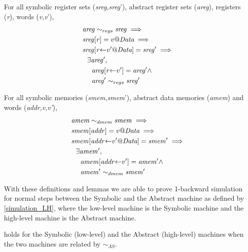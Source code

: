 \begin{lemma}
\label{refine_registers_upd}
For all symbolic register sets (\textit{sreg,sreg}'),
abstract register sets (\textit{areg}), registers (\textit{r}),
words (\textit{v,v}'),
\begin{align*}
  & \mathit{areg} \sim_{regs} \mathit{sreg} \implies \\
  & \mathit{sreg}[\mathit{r}] = v@\textit{Data} \implies \\
  & \mathit{sreg}[\mathit{r}{\leftarrow}v'@\textit{Data}] = \mathit{sreg'} \implies \\
  & ~~ \exists \mathit{areg'}, \\
  & ~~~~ \mathit{areg}[\mathit{r}{\leftarrow}v'] = \mathit{areg'} \land \\
  & ~~~~  \mathit{areg'} \sim_{regs} \mathit{sreg'}
\end{align*}
\end{lemma}

\begin{lemma}
\label{refine_memory_upd}
For all symbolic memories (\textit{smem,smem}'),
abstract data memories (\textit{amem}) and
words (\textit{addr,v,v'}),
\begin{align*}
  & \mathit{amem} \sim_{dmem} \mathit{smem} \implies \\
  & \mathit{smem}[\mathit{addr}] = v@\textit{Data} \implies \\
  & \mathit{smem}[\mathit{addr}{\leftarrow}v'@\textit{Data}] = \mathit{smem'} \implies \\
  & ~~ \exists \mathit{amem'}, \\
  & ~~~~ \mathit{amem}[\mathit{addr}{\leftarrow}v'] = \mathit{amem'} \land \\
  & ~~~~  \mathit{amem'} \sim_{dmem} \mathit{smem'}
\end{align*}
\end{lemma}

With these definitions and lemmas we are able to prove 1-backward simulation
for normal steps between the Symbolic and the Abstract machine as defined
by \cref{simulation_LH}, where the low-level machine is the Symbolic machine and
the high-level machine is the Abstract machine.

\begin{theorem}
\label{simulation_SA}
 holds for the Symbolic (low-level) and the
Abstract (high-level) machines when the two machines are related by
$\sim_{AS}$.
\end{theorem}

